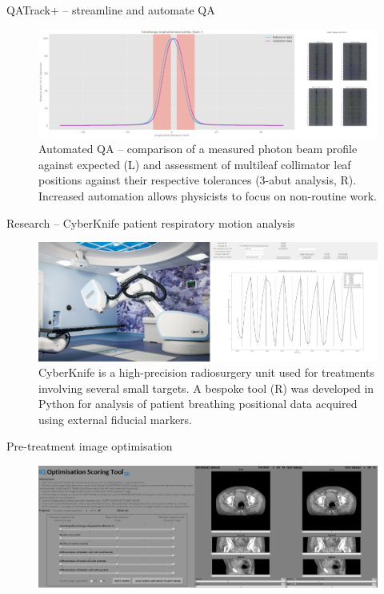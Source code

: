 \documentclass[final, unknownkeysallowed]{beamer}
\begin{document}
\begin{frame}{}
\begin{textblock}{19.3}
\begin{block}{QATrack+ -- streamline and automate QA}
\begin{figure}
        \end{figure}
        \begin{figure}
            \includegraphics[width = \textwidth]{qatrack_analysis.png}
            \caption*{Automated QA -- comparison of a measured photon beam profile against expected (L) and assessment of multileaf collimator leaf positions against their respective tolerances (3-abut analysis, R). Increased automation allows physicists to focus on non-routine work.}\label{fig:qatrack_analysis}
        \end{figure}
    \end{block}
%
    \begin{block}{Research -- CyberKnife patient respiratory motion analysis}
        \begin{figure}
            \includegraphics[width=\textwidth]{ck_with_software.png}
            \caption*{CyberKnife is a high-precision radiosurgery unit used for treatments involving several small targets. A bespoke tool (R) was developed in Python for analysis of patient breathing positional data acquired using external fiducial markers.}
        \end{figure}
    \end{block}
%
    \begin{block}{Pre-treatment image optimisation}
        \begin{figure}
            \includegraphics[width=\textwidth]{cbct_scoring_best.png}

\end{figure}
\end{block}
\end{textblock}
\end{frame}
\end{document}
